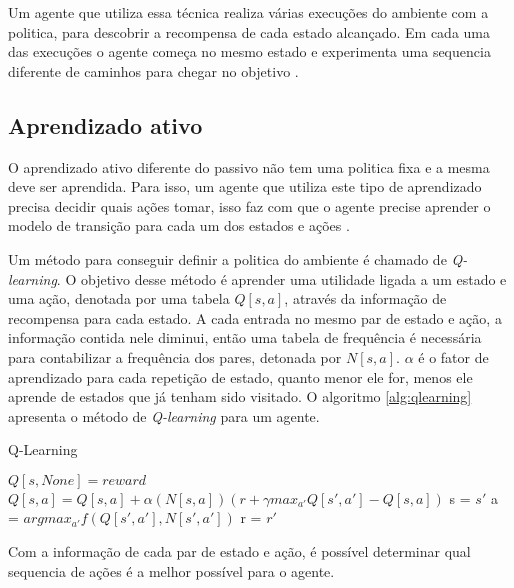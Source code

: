 Um agente que utiliza essa técnica realiza várias execuções do ambiente com a politica, para descobrir a recompensa de cada estado alcançado. Em cada uma das execuções o agente começa no mesmo estado e experimenta uma sequencia diferente de caminhos para chegar no objetivo \cite{intelligence2003modern}. 



\subsection{Aprendizado ativo}

O aprendizado ativo diferente do passivo não tem uma politica fixa e a mesma deve ser aprendida. Para isso, um agente que utiliza este tipo de aprendizado precisa decidir quais ações tomar, isso faz com que o agente precise aprender o modelo de transição para cada um dos estados e ações \cite{intelligence2003modern}. 

Um método para conseguir definir a politica do ambiente é chamado de \textit{Q-learning}. O objetivo desse método é aprender uma utilidade ligada a um estado e uma ação, denotada por uma tabela $Q[s,a]$, através da informação de recompensa para cada estado. A cada entrada no mesmo par de estado e ação, a informação contida nele diminui, então uma tabela de frequência é necessária para contabilizar a frequência dos pares, detonada por $N[s, a]$. $\alpha$ é o fator de aprendizado para cada repetição de estado, quanto menor ele for, menos ele aprende de estados que já tenham sido visitado. O algoritmo \ref{alg:qlearning} apresenta o método de \textit{Q-learning} para um agente.

\begin{algorithm}
	\caption{Q-Learning}
	\label{alg:qlearning}
	\begin{algorithmic}[]	
		\State	\Return $Q[s, None] = reward$
		\EndIf
		\State $Q[s, a] = Q[s, a] + \alpha(N[s, a]) (r + \gamma max_{a'} Q[s', a'] - Q[s, a])$
		\State s = $s'$
		\State a = $argmax_{a'} f(Q[s', a'], N[s', a'])$
		\State r = $r'$
		\EndIf	
		\EndFunction
	\end{algorithmic}
\end{algorithm}

Com a informação de cada par de estado e ação, é possível determinar qual sequencia de ações é a melhor possível para o agente.

